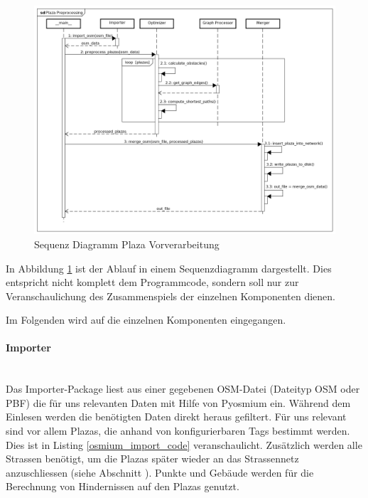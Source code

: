 \begin{figure}[ht]
    \centering
    \includegraphics[width=1\linewidth]{projectdoc/img/sequence_diagram_plaza_preprocessing.png}
    \caption[Sequenz Diagramm Plaza Vorverarbeitung]{Sequenz Diagramm Plaza Vorverarbeitung}
    \label{fig:sequence_diagram_plaza_preprocessing}
\end{figure}

In Abbildung \ref{fig:sequence_diagram_plaza_preprocessing} ist der Ablauf in einem Sequenzdiagramm dargestellt. Dies entspricht nicht komplett dem Programmcode, sondern soll nur zur Veranschaulichung des Zusammenspiels der einzelnen Komponenten dienen.

Im Folgenden wird auf die einzelnen Komponenten eingegangen.

\paragraph{Importer}\label{impl:Importer}~\\
Das Importer-Package liest aus einer gegebenen \ac{OSM}-Datei (Dateityp \ac{OSM} oder \ac{PBF}) die für uns relevanten Daten mit Hilfe von Pyosmium \cite{pyosmium} ein. Während dem Einlesen werden die benötigten Daten direkt heraus gefiltert. Für uns relevant sind vor allem Plazas, die anhand von konfigurierbaren Tags bestimmt werden. Dies ist in Listing \ref{osmium_import_code} veranschaulicht. Zusätzlich werden alle Strassen benötigt, um die Plazas später wieder an das Strassennetz anzuschliessen (siehe Abschnitt ). Punkte und Gebäude werden für die Berechnung von Hindernissen auf den Plazas genutzt.

